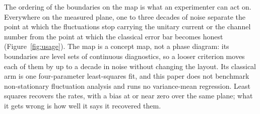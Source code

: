 The ordering of the boundaries on the map is what an experimenter can act on. Everywhere on the measured plane, one to three decades of noise separate the point at which the fluctuations stop carrying the unitary current or the channel number from the point at which the classical error bar becomes honest (Figure~\ref{fig:usage}). The map is a concept map, not a phase diagram: its boundaries are level sets of continuous diagnostics, so a looser criterion moves each of them by up to a decade in noise without changing the layout. Its classical arm is one four-parameter least-squares fit, and this paper does not benchmark non-stationary fluctuation analysis and runs no variance-mean regression. Least squares recovers the rates, with a bias at or near zero over the same plane; what it gets wrong is how well it says it recovered them. %

